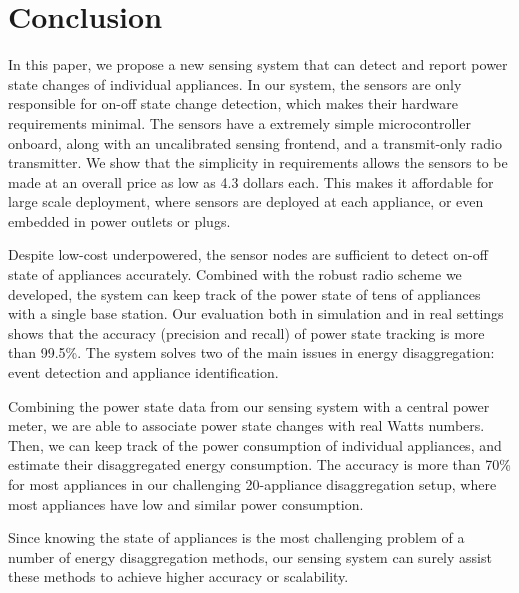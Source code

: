\chapter{Conclusion}\label{chap6}

In this paper, we propose a new sensing system that can detect and report power state changes of individual appliances. In our system, the sensors are only responsible for on-off state change detection, which makes their hardware requirements minimal. The sensors have a extremely simple microcontroller onboard, along with an uncalibrated sensing frontend, and a transmit-only radio transmitter. We show that the simplicity in requirements allows the sensors to be made at an overall price as low as 4.3 dollars each. This makes it affordable for large scale deployment, where sensors are deployed at each appliance, or even embedded in power outlets or plugs. 

Despite low-cost underpowered, the sensor nodes are sufficient to detect on-off state of appliances accurately. Combined with the robust radio scheme we developed, the system can keep track of the power state of tens of appliances with a single base station. Our evaluation both in simulation and in real settings shows that the accuracy (precision and recall) of power state tracking is more than 99.5\%. The system solves two of the main issues in energy disaggregation: event detection and appliance identification. 

Combining the power state data from our sensing system with a central power meter, we are able to associate power state changes with real Watts numbers. Then, we can keep track of the power consumption of individual appliances, and estimate their disaggregated energy consumption. The accuracy is more than 70\% for most appliances in our challenging 20-appliance disaggregation setup, where most appliances have low and similar power consumption. 

Since knowing the state of appliances is the most challenging problem of a number of energy disaggregation methods, our sensing system can surely assist these methods to achieve higher accuracy or scalability. 

